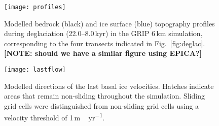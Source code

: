 \documentclass[tc, ms]{copernicus}
\newcommand{\note}[1]{\textbf{[NOTE: #1]}}
\begin{document}
\begin{figure}
  \texttt{[image: profiles]}
  \caption{Modelled bedrock (black) and ice surface (blue) topography profiles
           during deglaciation (22.0--8.0\,\unit{kyr}) in the GRIP 6\,\unit{km}
           simulation, corresponding to the four transects indicated in
           Fig.~\ref{fig:deglac}.
           \note{should we have a similar figure using EPICA?}}
  \label{fig:profiles}
\end{figure}

\begin{figure}
  \texttt{[image: lastflow]}
  \caption{Modelled directions of the last basal ice velocities. Hatches
           indicate areas that remain non-sliding throughout the simulation.
           Sliding grid cells were distinguished from non-sliding grid cells
           using a velocity threshold of 1\,\unit{m\,yr^{-1}}.}
  \label{fig:lastflow}
\end{figure}

\end{document}
